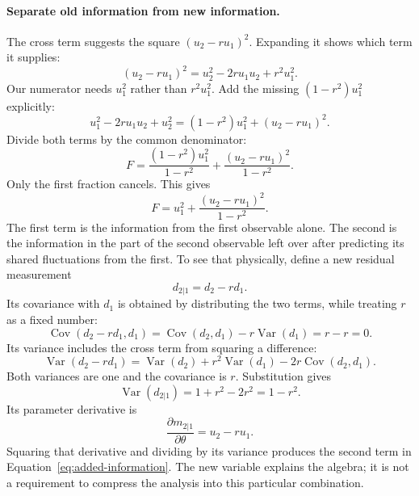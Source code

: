 \documentclass[11pt]{article}
\newcommand{\Var}{\operatorname{Var}}
\newcommand{\cov}{\operatorname{Cov}}
\begin{document}
\paragraph{Separate old information from new information.}
The cross term suggests the square $(u_2-r u_1)^2$. Expanding it
shows which term it supplies:
\begin{equation}
 (u_2-r u_1)^2=u_2^2-2r u_1u_2+r^2u_1^2.
\end{equation}
Our numerator needs $u_1^2$ rather than $r^2u_1^2$. Add the missing
$(1-r^2)u_1^2$ explicitly:
\begin{equation}
 u_1^2-2r u_1u_2+u_2^2
 =(1-r^2)u_1^2+(u_2-r u_1)^2.
\end{equation}
Divide both terms by the common denominator:
\begin{equation}
 F=\frac{(1-r^2)u_1^2}{1-r^2}
   +\frac{(u_2-r u_1)^2}{1-r^2}.
\end{equation}
Only the first fraction cancels. This gives
\begin{equation}
 F=u_1^2+\frac{(u_2-r u_1)^2}{1-r^2}.
 \label{eq:added-information}
\end{equation}
The first term is the information from the first observable alone. The
second is the information in the part of the second observable left over
after predicting its shared fluctuations from the first. To see that
physically, define a new residual measurement
\begin{equation}
 d_{2|1}=d_2-rd_1.
\end{equation}
Its covariance with $d_1$ is obtained by distributing the two
terms, while treating $r$ as a fixed number:
\begin{equation}
 \cov(d_2-rd_1,d_1)=\cov(d_2,d_1)-r\Var(d_1)=r-r=0.
\end{equation}
Its variance includes the cross term from squaring a difference:
\begin{equation}
 \Var(d_2-rd_1)=\Var(d_2)+r^2\Var(d_1)-2r\cov(d_2,d_1).
\end{equation}
Both variances are one and the covariance is $r$. Substitution gives
\begin{equation}
 \Var(d_{2|1})=1+r^2-2r^2=1-r^2.
\end{equation}
Its parameter derivative is
\begin{equation}
 \frac{\partial m_{2|1}}{\partial\theta}=u_2-r u_1.
\end{equation}
Squaring that derivative and dividing by its variance produces the
second term in Equation~\eqref{eq:added-information}. The new variable
explains the algebra; it is not a requirement to compress the analysis
into this particular combination.
\end{document}
